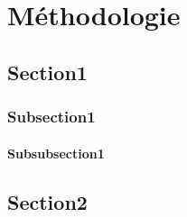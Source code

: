 \chapter{Méthodologie}
\section{Section1}
\subsection{Subsection1}
\subsubsection{Subsubsection1}
\lipsum[1-3]
\section{Section2}
\lipsum[1-3]
